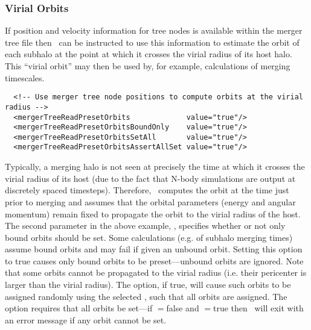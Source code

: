 \subsubsection{Virial Orbits}

If position and velocity information for tree nodes is available within the merger tree file then \glc\ can be instructed to use this information to estimate the orbit of each subhalo at the point at which it crosses the virial radius of its host halo. This ``virial orbit'' may then be used by, for example, calculations of merging timescales.
\begin{verbatim}
  <!-- Use merger tree node positions to compute orbits at the virial radius -->
  <mergerTreeReadPresetOrbits             value="true"/>
  <mergerTreeReadPresetOrbitsBoundOnly    value="true"/>
  <mergerTreeReadPresetOrbitsSetAll       value="true"/>
  <mergerTreeReadPresetOrbitsAssertAllSet value="true"/>
\end{verbatim}
Typically, a merging halo is not seen at precisely the time at which it crosses the virial radius of its host (due to the fact that N-body simulations are output at discretely spaced timesteps). Therefore, \glc\ computes the orbit at the time just prior to merging and assumes that the orbital parameters (energy and angular momentum) remain fixed to propagate the orbit to the virial radius of the host. The second parameter in the above example, {\normalfont \ttfamily [mergerTreeReadPresetOrbitsBoundOnly]}, specifies whether or not only bound orbits should be set. Some calculations (e.g. of subhalo merging times) assume bound orbits and may fail if given an unbound orbit. Setting this option to {\normalfont \ttfamily true} causes only bound orbits to be preset---unbound orbits are ignored. Note that some orbits cannot be propagated to the virial radius (i.e. their pericenter is larger than the virial radius). The {\normalfont \ttfamily [mergerTreeReadPresetOrbitsSetAll]} option, if true, will cause such orbits to be assigned randomly using the selected {\normalfont \ttfamily [virialOrbitsMethod]}, such that all orbits are assigned. The {\normalfont \ttfamily [mergerTreeReadPresetOrbitsAssertAllSet]} option requires that all orbits be set---if {\normalfont \ttfamily [mergerTreeReadPresetOrbitsSetAll]}$=${\normalfont \ttfamily false} and {\normalfont \ttfamily [mergerTreeReadPresetOrbitsAssertAllSet]}$=${\normalfont \ttfamily true} then \glc\ will exit with an error message if any orbit cannot be set.

